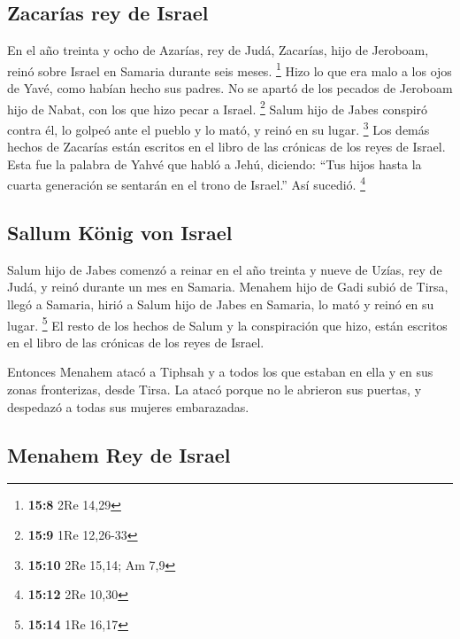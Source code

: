\hypertarget{zacaruxedas-rey-de-israel}{%
\subsection{Zacarías rey de Israel}\label{zacaruxedas-rey-de-israel}}

 En el año treinta y ocho de Azarías, rey de Judá,
Zacarías, hijo de Jeroboam, reinó sobre Israel en Samaria durante seis
meses. \footnote{\textbf{15:8} 2Re 14,29}  Hizo lo que era
malo a los ojos de Yavé, como habían hecho sus padres. No se apartó de
los pecados de Jeroboam hijo de Nabat, con los que hizo pecar a Israel.
\footnote{\textbf{15:9} 1Re 12,26-33}  Salum hijo de
Jabes conspiró contra él, lo golpeó ante el pueblo y lo mató, y reinó en
su lugar. \footnote{\textbf{15:10} 2Re 15,14; Am 7,9} 
Los demás hechos de Zacarías están escritos en el libro de las crónicas
de los reyes de Israel.  Esta fue la palabra de Yahvé que
habló a Jehú, diciendo: ``Tus hijos hasta la cuarta generación se
sentarán en el trono de Israel.'' Así sucedió. \footnote{\textbf{15:12}
  2Re 10,30}

\hypertarget{sallum-kuxf6nig-von-israel}{%
\subsection{Sallum König von Israel}\label{sallum-kuxf6nig-von-israel}}

 Salum hijo de Jabes comenzó a reinar en el año treinta y
nueve de Uzías, rey de Judá, y reinó durante un mes en Samaria.
 Menahem hijo de Gadi subió de Tirsa, llegó a Samaria,
hirió a Salum hijo de Jabes en Samaria, lo mató y reinó en su lugar.
\footnote{\textbf{15:14} 1Re 16,17}  El resto de los
hechos de Salum y la conspiración que hizo, están escritos en el libro
de las crónicas de los reyes de Israel.

 Entonces Menahem atacó a Tiphsah y a todos los que
estaban en ella y en sus zonas fronterizas, desde Tirsa. La atacó porque
no le abrieron sus puertas, y despedazó a todas sus mujeres embarazadas.

\hypertarget{menahem-rey-de-israel}{%
\subsection{Menahem Rey de Israel}\label{menahem-rey-de-israel}}

